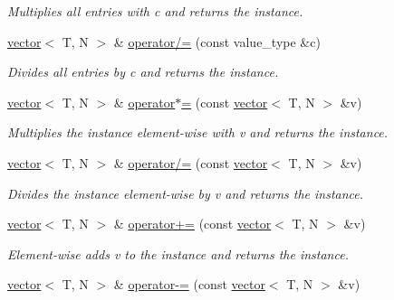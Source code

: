 \begin{DoxyCompactItemize}
\begin{DoxyCompactList}\small\item\em Multiplies all entries with c and returns the instance. \end{DoxyCompactList}\item 
\hypertarget{a00579_ab47eed5c602095956c2c91c290e44dcf}{}\hyperlink{a00579}{vector}$<$ T, N $>$ \& \hyperlink{a00579_ab47eed5c602095956c2c91c290e44dcf}{operator/=} (const value\+\_\+type \&c)\label{a00579_ab47eed5c602095956c2c91c290e44dcf}

\begin{DoxyCompactList}\small\item\em Divides all entries by c and returns the instance. \end{DoxyCompactList}\item 
\hypertarget{a00579_ad99ef7ae4880f5c79045fa7199a6bc1a}{}\hyperlink{a00579}{vector}$<$ T, N $>$ \& \hyperlink{a00579_ad99ef7ae4880f5c79045fa7199a6bc1a}{operator$\ast$=} (const \hyperlink{a00579}{vector}$<$ T, N $>$ \&v)\label{a00579_ad99ef7ae4880f5c79045fa7199a6bc1a}

\begin{DoxyCompactList}\small\item\em Multiplies the instance element-\/wise with v and returns the instance. \end{DoxyCompactList}\item 
\hypertarget{a00579_a506e4f2819fa020e13db64fcd5499c86}{}\hyperlink{a00579}{vector}$<$ T, N $>$ \& \hyperlink{a00579_a506e4f2819fa020e13db64fcd5499c86}{operator/=} (const \hyperlink{a00579}{vector}$<$ T, N $>$ \&v)\label{a00579_a506e4f2819fa020e13db64fcd5499c86}

\begin{DoxyCompactList}\small\item\em Divides the instance element-\/wise by v and returns the instance. \end{DoxyCompactList}\item 
\hypertarget{a00579_aae493dbdfc552c750f0f9285b19da798}{}\hyperlink{a00579}{vector}$<$ T, N $>$ \& \hyperlink{a00579_aae493dbdfc552c750f0f9285b19da798}{operator+=} (const \hyperlink{a00579}{vector}$<$ T, N $>$ \&v)\label{a00579_aae493dbdfc552c750f0f9285b19da798}

\begin{DoxyCompactList}\small\item\em Element-\/wise adds v to the instance and returns the instance. \end{DoxyCompactList}\item 
\hypertarget{a00579_a87d35ac1282c34e5e0d09d27a50c872d}{}\hyperlink{a00579}{vector}$<$ T, N $>$ \& \hyperlink{a00579_a87d35ac1282c34e5e0d09d27a50c872d}{operator-\/=} (const \hyperlink{a00579}{vector}$<$ T, N $>$ \&v)\label{a00579_a87d35ac1282c34e5e0d09d27a50c872d}


\end{DoxyCompactItemize}

